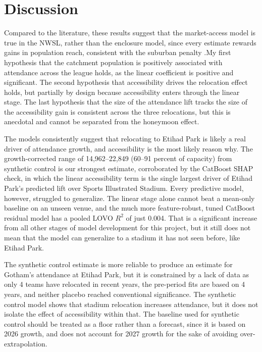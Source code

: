 \documentclass[9pt,twoside]{pnas-new}
\begin{document}
\section*{Discussion}
Compared to the literature, these results suggest that the market-access model is true in the NWSL, rather than the enclosure model, since every estimate rewards gains in population reach, consistent with the suburban penalty \cite{DoesLocationMatterAnEconometricAnalysisofStadiumLocationandAttendanceatNationalWomensSoccerLeagueMatches}.My first hypothesis that the catchment population is positively associated with attendance across the league holds, as the linear coefficient is positive and significant. The second hypothesis that accessibility drives the relocation effect holds, but partially by design because accessibility enters through the linear stage. The last hypothesis that the size of the attendance lift tracks the size of the accessibility gain is consistent across the three relocations, but this is anecdotal and cannot be separated from the honeymoon effect.

The models consistently suggest that relocating to Etihad Park is likely a real driver of attendance growth, and accessibility is the most likely reason why. The growth-corrected range of 14,962–22,849 (60–91 percent of capacity) from synthetic control is our strongest estimate, corroborated by the CatBoost SHAP check, in which the linear accessibility term is the single largest driver of Etihad Park's predicted lift over Sports Illustrated Stadium. Every predictive model, however, struggled to generalize. The linear stage alone cannot beat a mean-only baseline on an unseen venue, and the much more feature-robust, tuned CatBoost residual model has a pooled LOVO $R^2$ of just 0.004. That is a significant increase from all other stages of model development for this project, but it still does not mean that the model can generalize to a stadium it has not seen before, like Etihad Park.

The synthetic control estimate is more reliable to produce an estimate for Gotham's attendance at Etihad Park, but it is constrained by a lack of data as only 4 teams have relocated in recent years, the pre-period fits are based on 4 years, and neither placebo reached conventional significance. The synthetic control model shows that stadium relocation increases attendance, but it does not isolate the effect of accessibility within that. The baseline used for synthetic control should be treated as a floor rather than a forecast, since it is based on 2026 growth, and does not account for 2027 growth for the sake of avoiding over-extrapolation.
\end{document}
